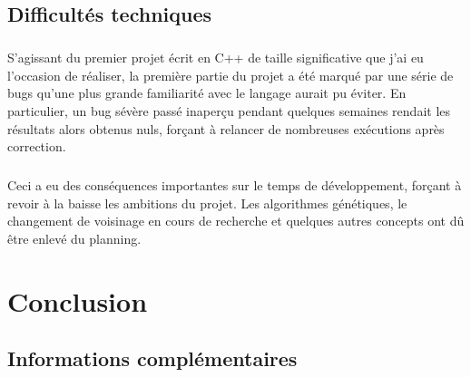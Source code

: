 \documentclass[a4paper,10pt]{report}
\begin{document}
\section{Difficultés techniques}

\paragraph{}
  S'agissant du premier projet écrit en C++ de taille significative que j'ai eu
l'occasion de réaliser, la première partie du projet a été marqué par une série
de bugs qu'une plus grande familiarité avec le langage aurait pu éviter. En
particulier, un bug sévère passé inaperçu pendant quelques semaines rendait les
résultats alors obtenus nuls, forçant à relancer de nombreuses exécutions après
correction.

\paragraph{}
  Ceci a eu des conséquences importantes sur le temps de développement, forçant
à revoir à la baisse les ambitions du projet. Les algorithmes génétiques, le
changement de voisinage en cours de recherche et quelques autres concepts ont dû
être enlevé du planning.


\chapter*{Conclusion}
\section*{} %


\section*{Informations complémentaires}
\end{document}
